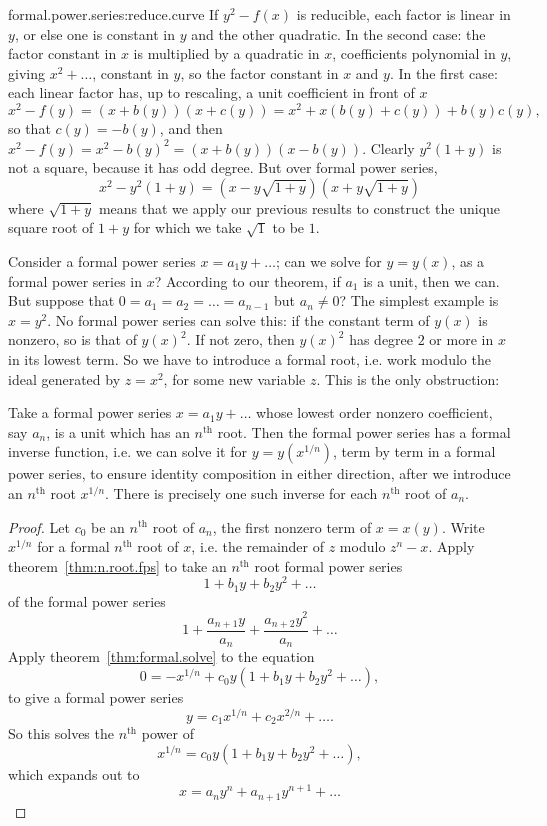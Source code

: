 \begin{answer}{formal.power.series:reduce.curve}
If \(y^2-f(x)\) is reducible, each factor is linear in \(y\), or else one is constant in \(y\) and the other quadratic.
In the second case: the factor constant in \(x\) is multiplied by a quadratic in \(x\), coefficients polynomial in \(y\), giving \(x^2+\dots\), constant in \(y\), so the factor constant in \(x\) and \(y\).
In the first case: each linear factor has, up to rescaling, a unit coefficient in front of \(x\)
\[
x^2-f(y)=(x+b(y))(x+c(y))=x^2+x(b(y)+c(y))+b(y)c(y),
\]
so that \(c(y)=-b(y)\), and then \(x^2-f(y)=x^2-b(y)^2=(x+b(y))(x-b(y))\).
Clearly \(y^2(1+y)\) is not a square, because it has odd degree.
But over formal power series,
\[
x^2-y^2(1+y)=(x-y\sqrt{1+y})(x+y\sqrt{1+y})
\]
where \(\sqrt{1+y}\) means that we apply our previous results to construct the unique square root of \(1+y\) for which we take \(\sqrt{1}\) to be \(1\).
\end{answer}
\begin{example}
Consider a formal power series \(x=a_1y+\dots\); can we solve for \(y=y(x)\), as a formal power series in \(x\)?
According to our theorem, if \(a_1\) is a unit, then we can.
But suppose that \(0=a_1=a_2=\dots=a_{n-1}\) but \(a_n\ne 0\)?
The simplest example is \(x=y^2\).
No formal power series can solve this: if the constant term of \(y(x)\) is nonzero, so is that of \(y(x)^2\).
If not zero, then \(y(x)^2\) has degree \(2\) or more in \(x\) in its lowest term.
So we have to introduce a formal root, i.e. work modulo the ideal generated by \(z=x^2\), for some new variable \(z\).
This is the only obstruction:
\end{example}
\begin{theorem}
Take a formal power series \(x=a_1y+\dots\) whose lowest order nonzero coefficient, say \(a_n\), is a unit which has an \(n^{\text{th}}\) root.
Then the formal power series has a formal inverse function, i.e. we can solve it for \(y=y(x^{1/n})\), term by term in a formal power series, to ensure identity composition in either direction, after we introduce an \(n^{\text{th}}\) root \(x^{1/n}\).
There is precisely one such inverse for each \(n^{\text{th}}\) root of \(a_n\).
\end{theorem}
\begin{proof}
Let \(c_0\) be an \(n^{\text{th}}\) root of \(a_n\), the first nonzero term of \(x=x(y)\).
Write \(x^{1/n}\) for a formal \(n^{\text{th}}\) root of \(x\), i.e. the remainder of \(z\) modulo \(z^n-x\).
Apply theorem~\vref{thm:n.root.fps} to take an \(n^{\text{th}}\) root formal power series
\[
1+b_1y+b_2y^2+\dots
\]
of the formal power series
\[
1+\frac{a_{n+1}y}{a_n}+\frac{a_{n+2}y^2}{a_n}+\dots
\]
Apply theorem~\vref{thm:formal.solve} to the equation
\[
0=-x^{1/n}+c_0y(1+b_1y+b_2y^2+\dots),
\]
to give a formal power series
\[
y=c_1x^{1/n}+c_2x^{2/n}+\dots.
\]
So this solves the \(n^{\text{th}}\) power of 
\[
x^{1/n}=c_0y(1+b_1y+b_2y^2+\dots),
\]
which expands out to
\[
x=a_n y^n + a_{n+1}y^{n+1}+\dots
\]
\end{proof}
